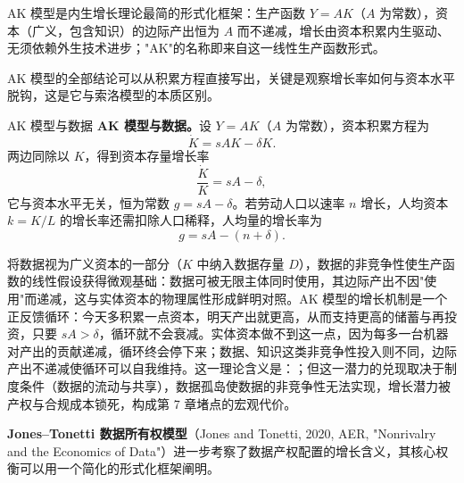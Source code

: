\begin{definition}[AK 模型]
AK 模型是内生增长理论最简的形式化框架：生产函数 $Y = AK$（$A$ 为常数），资本（广义，包含知识）的边际产出恒为 $A$ 而不递减，增长由资本积累内生驱动、无须依赖外生技术进步；"AK"的名称即来自这一线性生产函数形式。
\end{definition}

AK 模型的全部结论可以从积累方程直接写出，关键是观察增长率如何与资本水平脱钩，这是它与索洛模型的本质区别。

\begin{derivation}{AK 模型与数据}{}
\textbf{AK 模型与数据。}设 $Y = AK$（$A$ 为常数），资本积累方程为
\[
\dot K = sAK - \delta K.
\]
两边同除以 $K$，得到资本存量增长率
\[
\frac{\dot K}{K} = sA - \delta,
\]
它与资本水平无关，恒为常数 $g = sA - \delta$。若劳动人口以速率 $n$ 增长，人均资本 $k = K/L$ 的增长率还需扣除人口稀释，人均量的增长率为
\[
g = sA - (n+\delta).
\]
\end{derivation}

将数据视为广义资本的一部分（$K$ 中纳入数据存量 $D$），数据的非竞争性使生产函数的线性假设获得微观基础：数据可被无限主体同时使用，其边际产出不因"使用"而递减，这与实体资本的物理属性形成鲜明对照。AK 模型的增长机制是一个正反馈循环：今天多积累一点资本，明天产出就更高，从而支持更高的储蓄与再投资，只要 $sA>\delta$，循环就不会衰减。实体资本做不到这一点，因为每多一台机器对产出的贡献递减，循环终会停下来；数据、知识这类非竞争性投入则不同，边际产出不递减使循环可以自我维持。这一理论含义是：；但这一潜力的兑现取决于制度条件（数据的流动与共享），数据孤岛使数据的非竞争性无法实现，增长潜力被产权与合规成本锁死，构成第 7 章堵点的宏观代价。

\textbf{Jones–Tonetti 数据所有权模型}（Jones and Tonetti, 2020, AER, "Nonrivalry and the Economics of Data"）进一步考察了数据产权配置的增长含义，其核心权衡可以用一个简化的形式化框架阐明。

